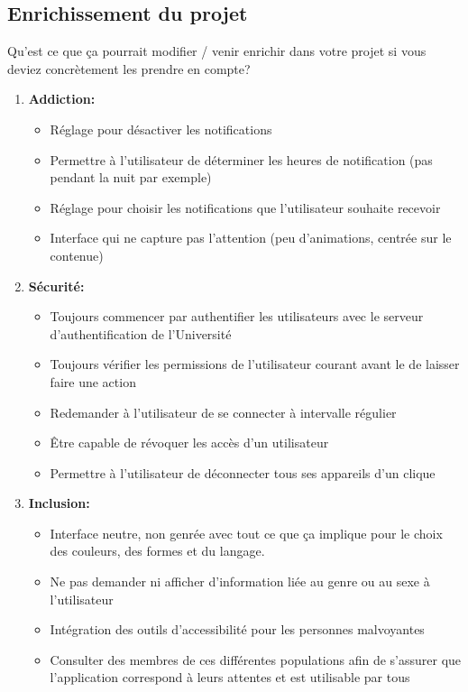 \subsection{Enrichissement du projet}
Qu’est ce que ça pourrait modifier / venir enrichir dans votre projet si vous deviez concrètement les prendre en compte?
\begin{enumerate}
	\item \textbf{Addiction:}
	\begin{itemize}
		\item Réglage pour désactiver les notifications
		\item Permettre à l'utilisateur de déterminer les heures de notification (pas pendant la nuit par exemple)
		\item Réglage pour choisir les notifications que l'utilisateur souhaite recevoir
		\item Interface qui ne capture pas l'attention (peu d'animations, centrée sur le contenue)
	\end{itemize}
	\item \textbf{Sécurité:}
	\begin{itemize}
		\item Toujours commencer par authentifier les utilisateurs avec le serveur d'authentification de l'Université
		\item Toujours vérifier les permissions de l'utilisateur courant avant le de laisser faire une action
		\item Redemander à l'utilisateur de se connecter à intervalle régulier 
		\item Être capable de révoquer les accès d'un utilisateur
		\item Permettre à l'utilisateur de déconnecter tous ses appareils d'un clique
	\end{itemize}
	\item \textbf{Inclusion:}
	\begin{itemize}
		\item Interface neutre, non genrée avec tout ce que ça implique pour le choix des couleurs, des formes et du langage. 
		\item Ne pas demander ni afficher d'information liée au genre ou au sexe à l'utilisateur
		\item Intégration des outils d'accessibilité pour les personnes malvoyantes
		\item Consulter des membres de ces différentes populations afin de s'assurer que l'application correspond à leurs attentes et est utilisable par tous
	\end{itemize}
\end{enumerate}

